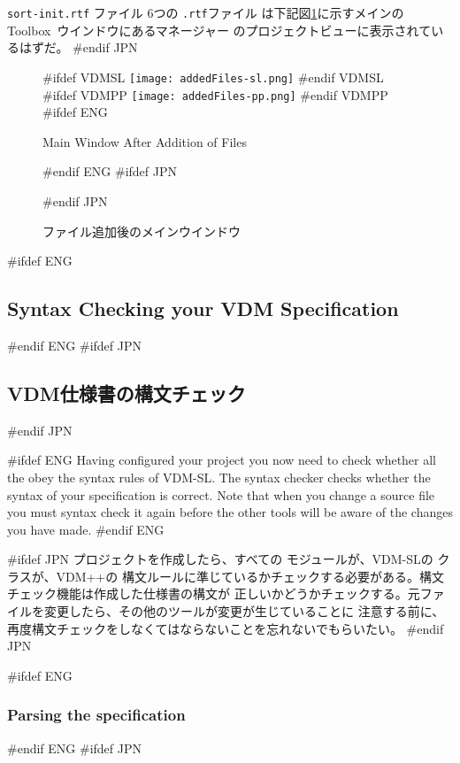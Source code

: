 \documentclass[\pformat,12pt]{article}
\newcommand{\vdmslpp}{VDM-SL}
\newcommand{\Toolbox}{Toolbox}
\newcommand{\vdmslpp}{VDM++}
\newcommand{\Toolbox}{Toolbox}
\newcommand{\guicmd}[1]{{\sf #1}}
\newcommand{\guicmd}[1]{{\gt #1}}
\begin{document}
{
  {\tt sort-init.rtf} ファイル
}
{
  6つの {\tt .rtf}ファイル
}
は下記図\ref{fig:addedfiles}に示すメインの
\Toolbox\ ウインドウにある\guicmd{マネージャー} の\guicmd{プロジェクトビュー}に表示されているはずだ。
#endif JPN

\begin{figure}[tbh]
\begin{center}
#ifdef VDMSL
\texttt{[image: addedFiles-sl.png]}
#endif VDMSL
#ifdef VDMPP
\texttt{[image: addedFiles-pp.png]}
#endif VDMPP
#ifdef ENG
\caption{Main Window After Addition of Files}
#endif ENG
#ifdef JPN
\caption{ファイル追加後のメインウインドウ}
#endif JPN
\label{fig:addedfiles}
\end{center}
\end{figure}


#ifdef ENG
\subsection{Syntax Checking your VDM Specification}
#endif ENG
#ifdef JPN
\subsection{VDM仕様書の構文チェック} 
#endif JPN

#ifdef ENG
Having configured your project you now need to check whether all the
 obey the syntax rules
of \vdmslpp.  The syntax checker checks whether the syntax of your
specification is correct. Note that when you change a source file you
must syntax check it again before the other tools will be aware of the
changes you have made.
#endif ENG

#ifdef JPN
プロジェクトを作成したら、すべての
{
モジュールが、VDM-SLの
}
{
クラスが、VDM++の
}
構文ルールに準じているかチェックする必要がある。構文チェック機能は作成した仕様書の構文が
正しいかどうかチェックする。元ファイルを変更したら、その他のツールが変更が生じていることに
注意する前に、再度構文チェックをしなくてはならないことを忘れないでもらいたい。
#endif JPN

#ifdef ENG
\subsubsection{Parsing the specification}
#endif ENG
#ifdef JPN
\end{document}
